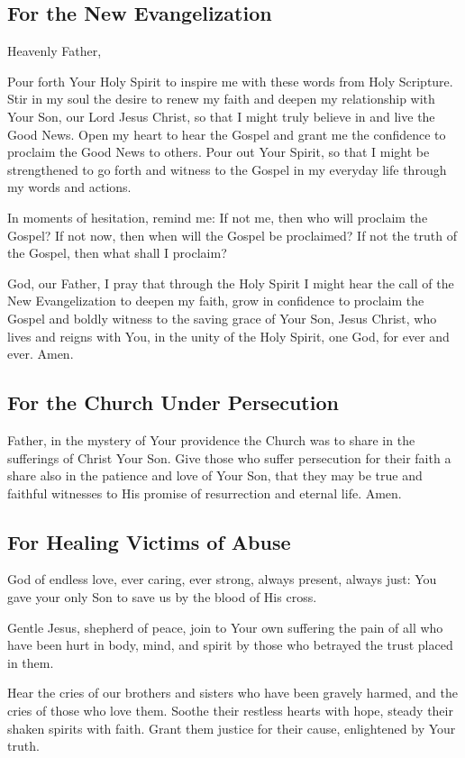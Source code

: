 \documentclass[12pt]{article}
\newcommand{\prayertitle}[1]{\subsection{#1}}
\begin{document}
\prayertitle{For the New Evangelization}
Heavenly Father,

Pour forth Your Holy Spirit to inspire me with these words from Holy Scripture.
Stir in my soul the desire to renew my faith and deepen my relationship with Your Son, our Lord Jesus Christ, so that I might truly believe in and live the Good News.   
Open my heart to hear the Gospel and grant me the confidence to proclaim the Good News to others.
Pour out Your Spirit, so that I might be strengthened to go forth and witness to the Gospel in my everyday life through my words and actions.  

In moments of hesitation, remind me:
If not me, then who will proclaim the Gospel?
If not now, then when will the Gospel be proclaimed?
If not the truth of the Gospel, then what shall I proclaim?

God, our Father, I pray that through the Holy Spirit I might hear the call of the New Evangelization to deepen my faith, grow in confidence to proclaim the Gospel and boldly witness to the saving grace of Your Son, Jesus Christ, who lives and reigns with You, in the unity of the Holy Spirit, one God, for ever and ever.
Amen.

\prayertitle{For the Church Under Persecution}
Father, in the mystery of Your providence the Church was to share in the sufferings of Christ Your Son.
Give those who suffer persecution for their faith a share also in the patience and love of Your Son, that they may be true and faithful witnesses to His promise of resurrection and eternal life.
Amen.

\prayertitle{For Healing Victims of Abuse}
God of endless love, ever caring, ever strong, always present, always just:
You gave your only Son to save us by the blood of His cross.

Gentle Jesus, shepherd of peace, join to Your own suffering the pain of all who have been hurt in body, mind, and spirit by those who betrayed the trust placed in them.

Hear the cries of our brothers and sisters who have been gravely harmed, and the cries of those who love them.
Soothe their restless hearts with hope, steady their shaken spirits with faith.
Grant them justice for their cause, enlightened by Your truth.
\end{document}
